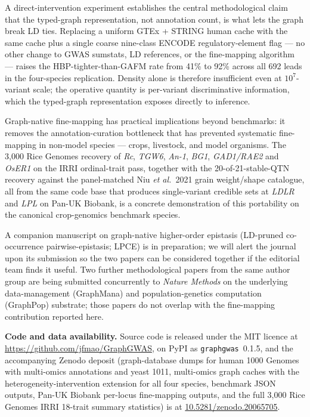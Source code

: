 \documentclass[11pt,a4paper]{article}
\begin{document}
A direct-intervention experiment establishes the central methodological claim that the
typed-graph representation, not annotation count, is what lets the graph break LD ties.
Replacing a uniform GTEx + STRING human cache with the same cache plus a single coarse
nine-class ENCODE regulatory-element flag --- no other change to GWAS sumstats, LD references,
or the fine-mapping algorithm --- raises the HBP-tighter-than-GAFM rate from 41\% to 92\%
across all 692 leads in the four-species replication. Density alone is therefore
insufficient even at $10^7$-variant scale; the operative quantity is per-variant
discriminative information, which the typed-graph representation exposes directly to inference.

Graph-native fine-mapping has practical implications beyond benchmarks: it removes the
annotation-curation bottleneck that has prevented systematic fine-mapping in non-model
species --- crops, livestock, and model organisms. The 3{,}000 Rice Genomes recovery of
\emph{Rc}, \emph{TGW6}, \emph{An-1}, \emph{BG1}, \emph{GAD1/RAE2} and \emph{OsER1} on the
IRRI ordinal-trait pass, together with the 20-of-21-stable-QTN recovery against the
panel-matched Niu \emph{et al.}\ 2021 grain weight/shape catalogue, all from the same code
base that produces single-variant credible sets at \emph{LDLR} and \emph{LPL} on Pan-UK
Biobank, is a concrete demonstration of this portability on the canonical crop-genomics
benchmark species.

A companion manuscript on graph-native higher-order epistasis (LD-pruned co-occurrence
pairwise-epistasis; LPCE) is in preparation; we will alert the journal upon its submission so
the two papers can be considered together if the editorial team finds it useful. Two further
methodological papers from the same author group are being submitted concurrently to
\textit{Nature Methods} on the underlying data-management (GraphMana) and population-genetics
computation (GraphPop) substrate; those papers do not overlap with the fine-mapping
contribution reported here.

\textbf{Code and data availability.}
Source code is released under the MIT licence at
\href{https://github.com/jfmao/GraphGWAS}{https://github.com/jfmao/GraphGWAS}, on PyPI as
\texttt{graphgwas}~0.1.5, and the accompanying Zenodo deposit (graph-database dumps for
human 1000 Genomes with multi-omics annotations and yeast 1011, multi-omics graph caches with
the heterogeneity-intervention extension for all four species, benchmark JSON outputs,
Pan-UK Biobank per-locus fine-mapping outputs, and the full 3{,}000 Rice Genomes IRRI
18-trait summary statistics) is at
\href{https://doi.org/10.5281/zenodo.20065705}{10.5281/zenodo.20065705}.
\end{document}
